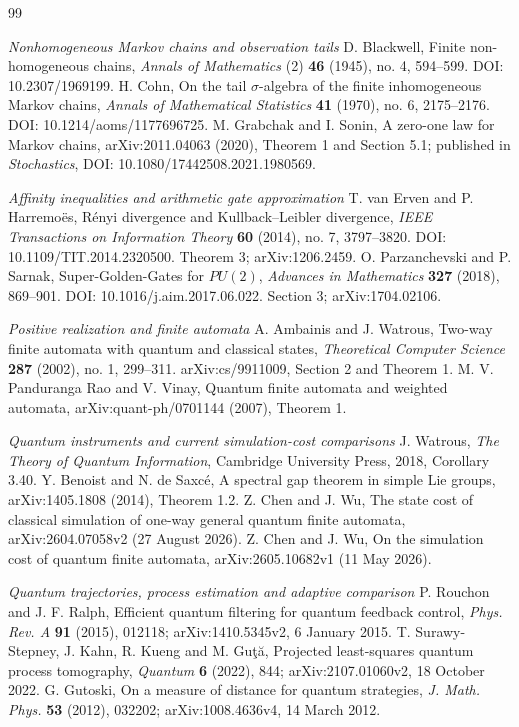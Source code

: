 \begin{thebibliography}{99}
\item[]\textit{Nonhomogeneous Markov chains and observation tails}
 D. Blackwell, Finite non-homogeneous chains, \emph{Annals of Mathematics} (2) \textbf{46} (1945), no. 4, 594--599. DOI: 10.2307/1969199.
 H. Cohn, On the tail $\sigma$-algebra of the finite inhomogeneous Markov chains, \emph{Annals of Mathematical Statistics} \textbf{41} (1970), no. 6, 2175--2176. DOI: 10.1214/aoms/1177696725.
 M. Grabchak and I. Sonin, A zero-one law for Markov chains, arXiv:2011.04063 (2020), Theorem 1 and Section 5.1; published in \emph{Stochastics}, DOI: 10.1080/17442508.2021.1980569.
\item[]\textit{Affinity inequalities and arithmetic gate approximation}
 T. van Erven and P. Harremo\"es, R\'enyi divergence and Kullback--Leibler divergence, \emph{IEEE Transactions on Information Theory} \textbf{60} (2014), no. 7, 3797--3820. DOI: 10.1109/TIT.2014.2320500. Theorem 3; arXiv:1206.2459.
 O. Parzanchevski and P. Sarnak, Super-Golden-Gates for $PU(2)$, \emph{Advances in Mathematics} \textbf{327} (2018), 869--901. DOI: 10.1016/j.aim.2017.06.022. Section 3; arXiv:1704.02106.
\item[]\textit{Positive realization and finite automata}
 A. Ambainis and J. Watrous, Two-way finite automata with quantum and classical states, \emph{Theoretical Computer Science} \textbf{287} (2002), no. 1, 299--311. arXiv:cs/9911009, Section 2 and Theorem 1.
 M. V. Panduranga Rao and V. Vinay, Quantum finite automata and weighted automata, arXiv:quant-ph/0701144 (2007), Theorem 1.

\item[]\textit{Quantum instruments and current simulation-cost comparisons}
 J. Watrous, \emph{The Theory of Quantum Information},
Cambridge University Press, 2018, Corollary 3.40.
 Y. Benoist and N. de Saxc\'e, A spectral gap theorem
in simple Lie groups, arXiv:1405.1808 (2014), Theorem 1.2.
 Z. Chen and J. Wu, The state cost of classical
simulation of one-way general quantum finite automata,
arXiv:2604.07058v2 (27 August 2026).
 Z. Chen and J. Wu, On the simulation cost of
quantum finite automata, arXiv:2605.10682v1 (11 May 2026).

\item[]\textit{Quantum trajectories, process estimation and adaptive comparison}
 P. Rouchon and J. F. Ralph,
Efficient quantum filtering for quantum feedback control,
\emph{Phys. Rev. A} \textbf{91} (2015), 012118;
arXiv:1410.5345v2, 6 January 2015.
 T. Surawy-Stepney, J. Kahn, R. Kueng and M. Gu\c{t}\u{a},
Projected least-squares quantum process tomography,
\emph{Quantum} \textbf{6} (2022), 844;
arXiv:2107.01060v2, 18 October 2022.
 G. Gutoski,
On a measure of distance for quantum strategies,
\emph{J. Math. Phys.} \textbf{53} (2012), 032202;
arXiv:1008.4636v4, 14 March 2012.
\end{thebibliography}
